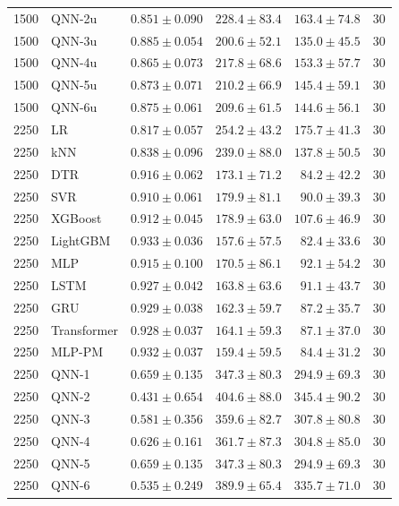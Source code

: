 \begin{longtable}{rlrrrr}
1500 & QNN-2u & $0.851 \pm 0.090$ & $228.4 \pm 83.4$ & $163.4 \pm 74.8$ & 30 \\
1500 & QNN-3u & $0.885 \pm 0.054$ & $200.6 \pm 52.1$ & $135.0 \pm 45.5$ & 30 \\
1500 & QNN-4u & $0.865 \pm 0.073$ & $217.8 \pm 68.6$ & $153.3 \pm 57.7$ & 30 \\
1500 & QNN-5u & $0.873 \pm 0.071$ & $210.2 \pm 66.9$ & $145.4 \pm 59.1$ & 30 \\
1500 & QNN-6u & $0.875 \pm 0.061$ & $209.6 \pm 61.5$ & $144.6 \pm 56.1$ & 30 \\
\midrule
2250 & LR & $0.817 \pm 0.057$ & $254.2 \pm 43.2$ & $175.7 \pm 41.3$ & 30 \\
2250 & kNN & $0.838 \pm 0.096$ & $239.0 \pm 88.0$ & $137.8 \pm 50.5$ & 30 \\
2250 & DTR & $0.916 \pm 0.062$ & $173.1 \pm 71.2$ & $84.2 \pm 42.2$ & 30 \\
2250 & SVR & $0.910 \pm 0.061$ & $179.9 \pm 81.1$ & $90.0 \pm 39.3$ & 30 \\
2250 & XGBoost & $0.912 \pm 0.045$ & $178.9 \pm 63.0$ & $107.6 \pm 46.9$ & 30 \\
2250 & LightGBM & $0.933 \pm 0.036$ & $157.6 \pm 57.5$ & $82.4 \pm 33.6$ & 30 \\
2250 & MLP & $0.915 \pm 0.100$ & $170.5 \pm 86.1$ & $92.1 \pm 54.2$ & 30 \\
2250 & LSTM & $0.927 \pm 0.042$ & $163.8 \pm 63.6$ & $91.1 \pm 43.7$ & 30 \\
2250 & GRU & $0.929 \pm 0.038$ & $162.3 \pm 59.7$ & $87.2 \pm 35.7$ & 30 \\
2250 & Transformer & $0.928 \pm 0.037$ & $164.1 \pm 59.3$ & $87.1 \pm 37.0$ & 30 \\
2250 & MLP-PM & $0.932 \pm 0.037$ & $159.4 \pm 59.5$ & $84.4 \pm 31.2$ & 30 \\
2250 & QNN-1 & $0.659 \pm 0.135$ & $347.3 \pm 80.3$ & $294.9 \pm 69.3$ & 30 \\
2250 & QNN-2 & $0.431 \pm 0.654$ & $404.6 \pm 88.0$ & $345.4 \pm 90.2$ & 30 \\
2250 & QNN-3 & $0.581 \pm 0.356$ & $359.6 \pm 82.7$ & $307.8 \pm 80.8$ & 30 \\
2250 & QNN-4 & $0.626 \pm 0.161$ & $361.7 \pm 87.3$ & $304.8 \pm 85.0$ & 30 \\
2250 & QNN-5 & $0.659 \pm 0.135$ & $347.3 \pm 80.3$ & $294.9 \pm 69.3$ & 30 \\
2250 & QNN-6 & $0.535 \pm 0.249$ & $389.9 \pm 65.4$ & $335.7 \pm 71.0$ & 30 \\

\end{longtable}
